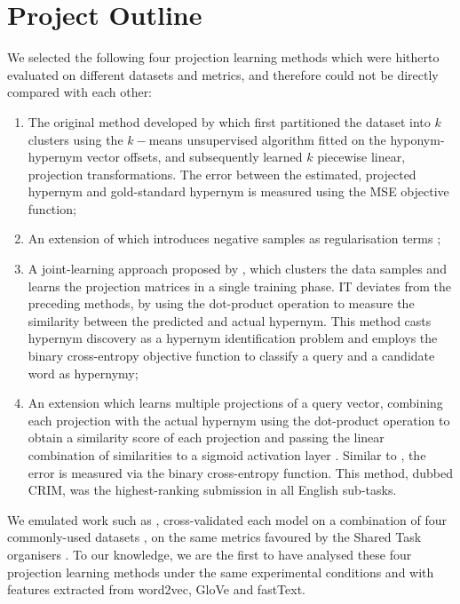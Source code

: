 \section{Project Outline} %
We selected the following four projection learning methods which were hitherto evaluated on different datasets and metrics, and  therefore could not be directly compared with each other:
\begin{enumerate}
    \item The original method developed by \citet{Fu2014} which first partitioned the dataset into $k$ clusters using the $k-$means unsupervised algorithm fitted on the hyponym-hypernym vector offsets, and subsequently learned $k$ piecewise linear, projection transformations.  The error between the estimated, projected hypernym and gold-standard hypernym is measured using the \ac{MSE} objective function;
    \item An extension of \citep{Fu2014} which introduces negative samples as regularisation terms \citep{ustalov2017negative};
    \item A joint-learning approach proposed by \citet{yamane2016distributional}, which clusters the data samples and learns the projection matrices in a single training phase.  IT deviates from the preceding methods, by using the dot-product operation to measure the similarity between the predicted and actual hypernym.  This method casts hypernym discovery as a hypernym identification problem and employs the binary cross-entropy objective function to classify a query and a candidate word as hypernymy;
    \item An extension \citet{yamane2016distributional} which learns multiple projections of a query vector, combining each projection with the actual hypernym using the dot-product operation to obtain a similarity score of each projection and passing the linear combination of similarities to a sigmoid activation layer \citep{bernier2018crim}.  Similar to \citet{yamane2016distributional}, the error is measured via the binary cross-entropy function.  This method, dubbed CRIM, was the highest-ranking submission in all English sub-tasks.
\end{enumerate}
We emulated work such as \citep{shwartz2017siege, levy2015supervised}, cross-validated each model on a combination of four commonly-used datasets \citep{santus2015evalution, Baroni2011, santus2016nine, necsulescu2015reading}, on the same metrics favoured by the Shared Task organisers \citep{camacho2018semeval}.  To our knowledge, we are the first to have analysed these four projection learning methods under the same experimental conditions and with features extracted from word2vec, GloVe and fastText.

